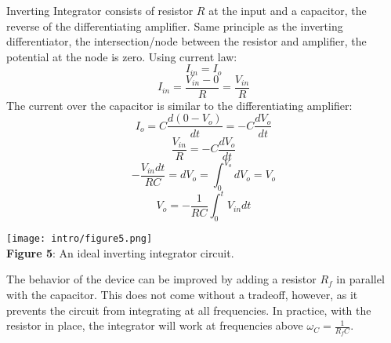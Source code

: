 \documentclass[11pt]{article}
\begin{document}
Inverting Integrator consists of resistor $R$ at the input and a capacitor, the reverse of the differentiating amplifier. Same principle as the inverting differentiator, the intersection/node between the resistor and amplifier, the potential at the node is zero. Using current law:
\begin{equation}
    I_{in}=I_o
\end{equation}
\begin{equation}
    I_{in}=\frac{V_{in}-0}{R}=\frac{V_{in}}{R}
\end{equation}
The current over the capacitor is similar to the differentiating amplifier:
\begin{equation}
    I_o=C\frac{d(0-V_o)}{dt}=-C\frac{dV_o}{dt}
\end{equation}
\begin{equation}
    \frac{V_{in}}{R}=-C\frac{dV_o}{dt}
\end{equation}
\begin{equation}
    -\frac{V_{in}dt}{RC}=dV_o=\int^{V_o}_0dV_o=V_o
\end{equation}
\begin{equation}
    V_o=-\frac{1}{RC}\int^t_0 V_{in} dt
\end{equation}
\begin{center}
    \texttt{[image: intro/figure5.png]}\\\textbf{Figure 5}: An ideal inverting integrator circuit.
\end{center}
The behavior of the device can be improved by adding a resistor $R_f$ in parallel with the capacitor. This does not come without a tradeoff, however, as it prevents the circuit from integrating at all frequencies. In practice, with the resistor in place, the integrator will work at frequencies above $\omega_C=\frac{1}{R_fC}$.
\end{document}

